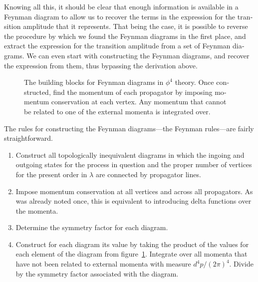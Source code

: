 \begin{english}
Knowing all this, it should be clear that enough information is available in a Feynman diagram to allow us to recover the terms in the expression for the transition amplitude that it represents. That being the case, it is possible to reverse the procedure by which we found the Feynman diagrams in the first place, and extract the expression for the transition amplitude from a set of Feynman diagrams. We can even start with constructing the Feynman diagrams, and recover the expression from them, thus bypassing the derivation above.


\begin{figure}[htb]
\hfill
{}
\hfill
{}
\hfill \phantom{d}
\caption{The building blocks for Feynman diagrams in $\phi^4$ theory. Once constructed, find the momentum of each propagator by imposing momentum conservation at each vertex. Any momentum that cannot be related to one of the external momenta is integrated over.
\label{phi4rules}}
\end{figure}


The rules for constructing the Feynman diagrams---the Feynman rules---are fairly straightforward.

\begin{enumerate}
\item Construct all topologically inequivalent diagrams in which the ingoing and outgoing states for the process in question and the proper number of vertices for the present order in $\lambda$ are connected by propagator lines.
\item Impose momentum conservation at all vertices and across all propagators. As was already noted once, this is equivalent to introducing delta functions over the momenta.
\item Determine the symmetry factor for each diagram.
\item Construct for each diagram its value by taking the product of the values for each element of the diagram from figure~\ref{phi4rules}. Integrate over all momenta that have not been related to external momenta with measure $d^4p/(2\pi)^4$. Divide by the symmetry factor associated with the diagram.
\end{enumerate}



\end{english}
